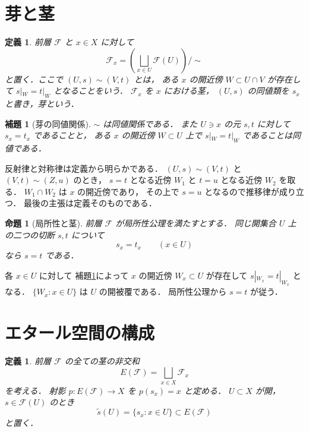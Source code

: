 \documentclass[a5paper,10pt,onecolumn]{jsarticle}
\makeatletter
\theoremstyle{mathnotetheorem}
\newtheorem{definition}[theorem]{定義}
\newtheorem{lemma}[theorem]{補題}
\newtheorem{proposition}[theorem]{命題}
\renewcommand{\proofname}{証明}
\renewenvironment{proof}[1][\proofname]{%
  \par\pushQED{\qed}\normalfont\topsep4\p@\@plus2\p@\relax
  \trivlist\item[\hskip\labelsep\bfseries #1]\ignorespaces
}{\popQED\endtrivlist\@endpefalse}
\makeatother
\begin{document}
\section{芽と茎}

\begin{definition}
前層 $\mathcal F$ と $x\in X$ に対して
\[
 \mathcal F_x=
 \left(\bigsqcup_{x\in U}\mathcal F(U)\right)\big/{\sim}
\]
と置く．ここで $(U,s)\sim(V,t)$ とは，
ある $x$ の開近傍 $W\subset U\cap V$ が存在して
$s|_W=t|_W$ となることをいう．
$\mathcal F_x$ を $x$ における\emph{茎}，
$(U,s)$ の同値類を $s_x$ と書き，\emph{芽}という．
\end{definition}

\begin{lemma}[芽の同値関係]\label{lem:germs}
$\sim$ は同値関係である．
また $U\ni x$ の元 $s,t$ に対して
$s_x=t_x$ であることと，
ある $x$ の開近傍 $W\subset U$ 上で
$s|_W=t|_W$ であることは同値である．
\end{lemma}
\begin{proof}
反射律と対称律は定義から明らかである．
$(U,s)\sim(V,t)$ と $(V,t)\sim(Z,u)$ のとき，
$s=t$ となる近傍 $W_1$ と
$t=u$ となる近傍 $W_2$ を取る．
$W_1\cap W_2$ は $x$ の開近傍であり，
その上で $s=u$ となるので推移律が成り立つ．
最後の主張は定義そのものである．
\end{proof}

\begin{proposition}[局所性と茎]\label{prop:stalk-separated}
前層 $\mathcal F$ が局所性公理を満たすとする．
同じ開集合 $U$ 上の二つの切断 $s,t$ について
\[
 s_x=t_x\qquad(x\in U)
\]
なら $s=t$ である．
\end{proposition}
\begin{proof}
各 $x\in U$ に対して
補題\ref{lem:germs}によって
$x$ の開近傍 $W_x\subset U$ が存在して
$s|_{W_x}=t|_{W_x}$ となる．
$\{W_x:x\in U\}$ は $U$ の開被覆である．
局所性公理から $s=t$ が従う．
\end{proof}

\section{エタール空間の構成}

\begin{definition}
前層 $\mathcal F$ の全ての茎の非交和
\[
 E(\mathcal F)=\bigsqcup_{x\in X}\mathcal F_x
\]
を考える．
射影
$p:E(\mathcal F)\to X$ を
$p(s_x)=x$ と定める．
$U\subset X$ が開，$s\in\mathcal F(U)$ のとき
\[
 \widetilde s(U)=\{s_x:x\in U\}\subset E(\mathcal F)
\]
と置く．
\end{definition}
\end{document}
